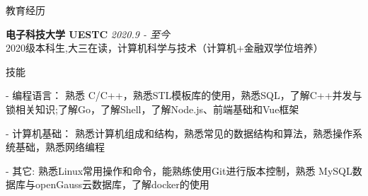 \documentclass{resume} %
\begin{document}

\begin{rSection}{教育经历}

{\textbf{电子科技大学 UESTC}} \hfill {\em 2020.9 - 至今} \\
2020级本科生,大三在读，计算机科学与技术（计算机+金融双学位培养）

\end{rSection}



\begin{rSection}{技能}
\begin{rSubsection}
{}{}{}{}
\item[-] 编程语言： 熟悉 C/C++，熟悉STL模板库的使用，熟悉SQL，了解C++并发与锁相关知识;了解Go，了解Shell，了解Node.js、前端基础和Vue框架
\item[-] 计算机基础： 熟悉计算机组成和结构，熟悉常见的数据结构和算法，熟悉操作系统基础，熟悉网络编程
\item[-] 其它: 熟悉Linux常用操作和命令，能熟练使用Git进行版本控制，熟悉 MySQL数据库与openGauss云数据库，了解docker的使用
\end{rSubsection}
\end{rSection}


\end{document}

